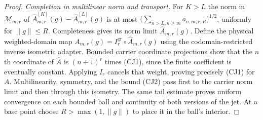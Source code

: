 \documentclass[11pt,a4paper]{article}
\theoremstyle{definition}
\theoremstyle{remark}
\begin{document}
\begin{proof}
\emph{Completion in multilinear norm and transport.}
For $K>L$ the norm in $\mathcal M_{m,r}$ of
$\widehat A^{[K]}_{m,r}(g)-\widehat A^{[L]}_{m,r}(g)$ is at most
$\big(\sum_{n>L,n\geq m}a_{n,m,r,R}\big)^{1/2}$, uniformly
for $\|g\|\leq R$. Completeness gives its norm limit
$\widehat A_{m,r}(g)$. Define the physical weighted-domain map
$A_{m,r}(g)=I_r^{\mathrm{gr}}\circ\widehat A_{m,r}(g)$ using the
codomain-restricted inverse isometric adapter. Bounded carrier coordinate projections show
that the $n$th coordinate of $\widehat A$ is $(n+1)^r$ times
(CJ1), since the finite coefficient is eventually constant.
Applying $I_r$ cancels that weight, proving precisely (CJ1)
for $A$. Multilinearity, symmetry, and the bound (CJ2) pass
first to the carrier norm limit and then through this isometry.
The same tail estimate proves uniform convergence on each bounded
ball and continuity of both versions of the jet. At a base point
choose $R>\max(1,\|g\|)$ to place it in the ball's interior.


\end{proof}
\end{document}
